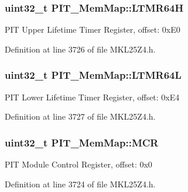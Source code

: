 \subsubsection[{\texorpdfstring{L\+T\+M\+R64H}{LTMR64H}}]{\setlength{\rightskip}{0pt plus 5cm}uint32\+\_\+t P\+I\+T\+\_\+\+Mem\+Map\+::\+L\+T\+M\+R64H}\hypertarget{struct_p_i_t___mem_map_ad3448e6c2eea0b7ed2addf8ab1919bdf}{}\label{struct_p_i_t___mem_map_ad3448e6c2eea0b7ed2addf8ab1919bdf}
P\+IT Upper Lifetime Timer Register, offset\+: 0x\+E0 

Definition at line 3726 of file M\+K\+L25\+Z4.\+h.

\subsubsection[{\texorpdfstring{L\+T\+M\+R64L}{LTMR64L}}]{\setlength{\rightskip}{0pt plus 5cm}uint32\+\_\+t P\+I\+T\+\_\+\+Mem\+Map\+::\+L\+T\+M\+R64L}\hypertarget{struct_p_i_t___mem_map_aa30a91d3094027918061fd20d9d0b845}{}\label{struct_p_i_t___mem_map_aa30a91d3094027918061fd20d9d0b845}
P\+IT Lower Lifetime Timer Register, offset\+: 0x\+E4 

Definition at line 3727 of file M\+K\+L25\+Z4.\+h.

\subsubsection[{\texorpdfstring{M\+CR}{MCR}}]{\setlength{\rightskip}{0pt plus 5cm}uint32\+\_\+t P\+I\+T\+\_\+\+Mem\+Map\+::\+M\+CR}\hypertarget{struct_p_i_t___mem_map_a99390c5764693e07c37d40ead441a7a4}{}\label{struct_p_i_t___mem_map_a99390c5764693e07c37d40ead441a7a4}
P\+IT Module Control Register, offset\+: 0x0 

Definition at line 3724 of file M\+K\+L25\+Z4.\+h.

